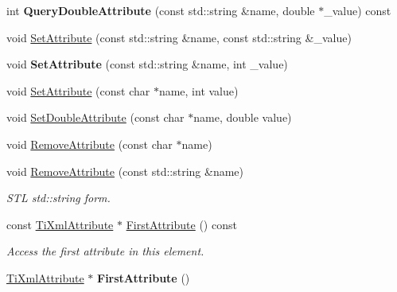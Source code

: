 \begin{DoxyCompactItemize}
\item 
\hypertarget{class_ti_xml_element_a157250e0c0303657d911f6991106ba73}{
int {\bfseries QueryDoubleAttribute} (const std::string \&name, double $\ast$\_\-value) const }
\label{class_ti_xml_element_a157250e0c0303657d911f6991106ba73}

\item 
void \hyperlink{class_ti_xml_element_a80ed65b1d194c71c6c9986ae42337d7d}{SetAttribute} (const std::string \&name, const std::string \&\_\-value)
\item 
\hypertarget{class_ti_xml_element_a6f18d54fbe25bbc527936ee65363b3c5}{
void {\bfseries SetAttribute} (const std::string \&name, int \_\-value)}
\label{class_ti_xml_element_a6f18d54fbe25bbc527936ee65363b3c5}

\item 
void \hyperlink{class_ti_xml_element_ace6f4be75e373726d4774073d666d1a7}{SetAttribute} (const char $\ast$name, int value)
\item 
void \hyperlink{class_ti_xml_element_a0d1dd975d75496778177e35abfe0ec0b}{SetDoubleAttribute} (const char $\ast$name, double value)
\item 
void \hyperlink{class_ti_xml_element_a56979767deca794376b1dfa69a525b2a}{RemoveAttribute} (const char $\ast$name)
\item 
\hypertarget{class_ti_xml_element_a1afa6aea716511326a608e4c05df4f3a}{
void \hyperlink{class_ti_xml_element_a1afa6aea716511326a608e4c05df4f3a}{RemoveAttribute} (const std::string \&name)}
\label{class_ti_xml_element_a1afa6aea716511326a608e4c05df4f3a}

\begin{DoxyCompactList}\small\item\em STL std::string form. \item\end{DoxyCompactList}\item 
\hypertarget{class_ti_xml_element_a516054c9073647d6cb29b6abe9fa0592}{
const \hyperlink{class_ti_xml_attribute}{TiXmlAttribute} $\ast$ \hyperlink{class_ti_xml_element_a516054c9073647d6cb29b6abe9fa0592}{FirstAttribute} () const }
\label{class_ti_xml_element_a516054c9073647d6cb29b6abe9fa0592}

\begin{DoxyCompactList}\small\item\em Access the first attribute in this element. \item\end{DoxyCompactList}\item 
\hypertarget{class_ti_xml_element_a4b33780fc565d38d6b54f640e0cf1737}{
\hyperlink{class_ti_xml_attribute}{TiXmlAttribute} $\ast$ {\bfseries FirstAttribute} ()}
\label{class_ti_xml_element_a4b33780fc565d38d6b54f640e0cf1737}


\end{DoxyCompactItemize}
